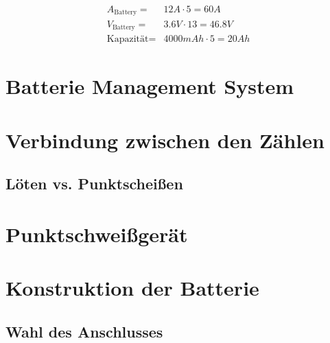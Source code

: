 \begin{align}
    A_{\textrm{Battery}} =& 12 A\cdot 5 = 60 A\\
    V_{\textrm{Battery}} =& 3.6V \cdot 13 = 46.8V\\
    \textrm{Kapazität} =& 4000mAh \cdot 5 = 20 Ah
    \label{eq:Strom}
\end{align}

\section{Batterie Management System}


\section{Verbindung zwischen den Zählen}

\subsection{Löten vs. Punktscheißen}

\section{Punktschweißgerät}

\section{Konstruktion der Batterie}

\subsection{Wahl des Anschlusses}